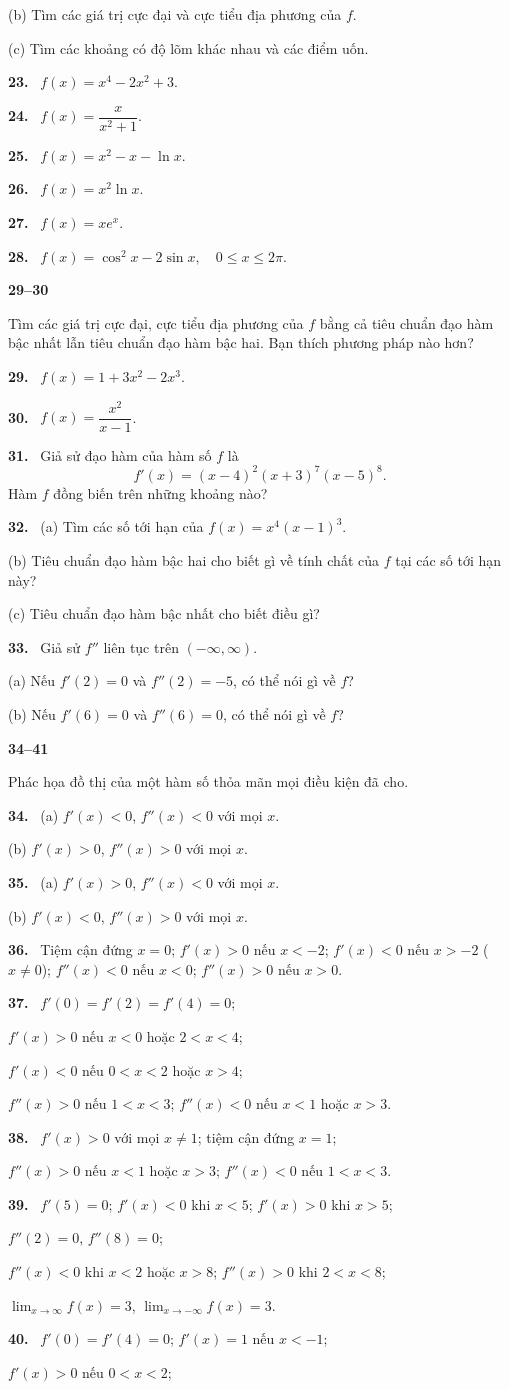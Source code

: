 \documentclass[12pt,a4paper]{article}
\newcommand{\bt}[1]{\par\smallskip\Needspace{5\baselineskip}\noindent\textbf{#1.}\ }
\newcommand{\group}[1]{\par\medskip\noindent\textbf{#1}\par\nopagebreak[4]}
\begin{document}
(b) Tìm các giá trị cực đại và cực tiểu địa phương của $f$.

(c) Tìm các khoảng có độ lõm khác nhau và các điểm uốn.
\bt{23} $f(x)=x^4-2x^2+3$.
\bt{24} $f(x)=\dfrac{x}{x^2+1}$.
\bt{25} $f(x)=x^2-x-\ln x$.
\bt{26} $f(x)=x^2\ln x$.
\bt{27} $f(x)=xe^x$.
\bt{28} $f(x)=\cos^2x-2\sin x,\quad0\le x\le2\pi$.
\group{29–30} Tìm các giá trị cực đại, cực tiểu địa phương của $f$ bằng cả tiêu chuẩn đạo hàm bậc nhất lẫn tiêu chuẩn đạo hàm bậc hai. Bạn thích phương pháp nào hơn?
\bt{29} $f(x)=1+3x^2-2x^3$.
\bt{30} $f(x)=\dfrac{x^2}{x-1}$.
\bt{31} Giả sử đạo hàm của hàm số $f$ là
\[f'(x)=(x-4)^2(x+3)^7(x-5)^8.\]
Hàm $f$ đồng biến trên những khoảng nào?
\bt{32} (a) Tìm các số tới hạn của $f(x)=x^4(x-1)^3$.

(b) Tiêu chuẩn đạo hàm bậc hai cho biết gì về tính chất của $f$ tại các số tới hạn này?

(c) Tiêu chuẩn đạo hàm bậc nhất cho biết điều gì?
\bt{33} Giả sử $f''$ liên tục trên $(-\infty,\infty)$.

(a) Nếu $f'(2)=0$ và $f''(2)=-5$, có thể nói gì về $f$?

(b) Nếu $f'(6)=0$ và $f''(6)=0$, có thể nói gì về $f$?
\group{34–41} Phác họa đồ thị của một hàm số thỏa mãn mọi điều kiện đã cho.
\bt{34} (a) $f'(x)<0$, $f''(x)<0$ với mọi $x$.

(b) $f'(x)>0$, $f''(x)>0$ với mọi $x$.
\bt{35} (a) $f'(x)>0$, $f''(x)<0$ với mọi $x$.

(b) $f'(x)<0$, $f''(x)>0$ với mọi $x$.
\bt{36} Tiệm cận đứng $x=0$; $f'(x)>0$ nếu $x<-2$; $f'(x)<0$ nếu $x>-2$ ($x\ne0$); $f''(x)<0$ nếu $x<0$; $f''(x)>0$ nếu $x>0$.
\bt{37} $f'(0)=f'(2)=f'(4)=0$;

$f'(x)>0$ nếu $x<0$ hoặc $2<x<4$;

$f'(x)<0$ nếu $0<x<2$ hoặc $x>4$;

$f''(x)>0$ nếu $1<x<3$; $f''(x)<0$ nếu $x<1$ hoặc $x>3$.
\bt{38} $f'(x)>0$ với mọi $x\ne1$; tiệm cận đứng $x=1$;

$f''(x)>0$ nếu $x<1$ hoặc $x>3$; $f''(x)<0$ nếu $1<x<3$.
\bt{39} $f'(5)=0$; $f'(x)<0$ khi $x<5$; $f'(x)>0$ khi $x>5$;

$f''(2)=0$, $f''(8)=0$;

$f''(x)<0$ khi $x<2$ hoặc $x>8$; $f''(x)>0$ khi $2<x<8$;

$\displaystyle\lim_{x\to\infty}f(x)=3$, $\displaystyle\lim_{x\to-\infty}f(x)=3$.
\bt{40} $f'(0)=f'(4)=0$; $f'(x)=1$ nếu $x<-1$;

$f'(x)>0$ nếu $0<x<2$;
\end{document}
